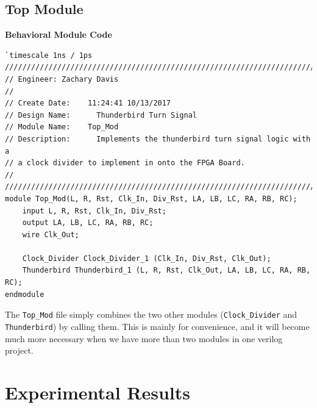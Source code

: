 \documentclass[12pt]{report}
\begin{document}
\subsection*{Top Module}
\textbf{Behavioral Module Code}
		\begin{Verbatim}[frame=single, fontsize=\small]
`timescale 1ns / 1ps
////////////////////////////////////////////////////////////////////////////////
// Engineer: Zachary Davis
// 
// Create Date:    11:24:41 10/13/2017 
// Design Name: 	 Thunderbird Turn Signal
// Module Name:    Top_Mod  
// Description: 	 Implements the thunderbird turn signal logic with a 
// a clock divider to implement in onto the FPGA Board.
//
////////////////////////////////////////////////////////////////////////////////
module Top_Mod(L, R, Rst, Clk_In, Div_Rst, LA, LB, LC, RA, RB, RC);
	input L, R, Rst, Clk_In, Div_Rst;
	output LA, LB, LC, RA, RB, RC;
	wire Clk_Out;
	
	Clock_Divider Clock_Divider_1 (Clk_In, Div_Rst, Clk_Out);
	Thunderbird Thunderbird_1 (L, R, Rst, Clk_Out, LA, LB, LC, RA, RB, RC);
endmodule

		\end{Verbatim}

		The \texttt{Top\_Mod} file simply combines the two other modules (\texttt{Clock\_Divider} and \texttt{Thunderbird}) by calling them. This is mainly for convenience, and it will become much more necessary when we have more than two modules in one verilog project.

\newpage
\section*{Experimental Results}
\end{document}
